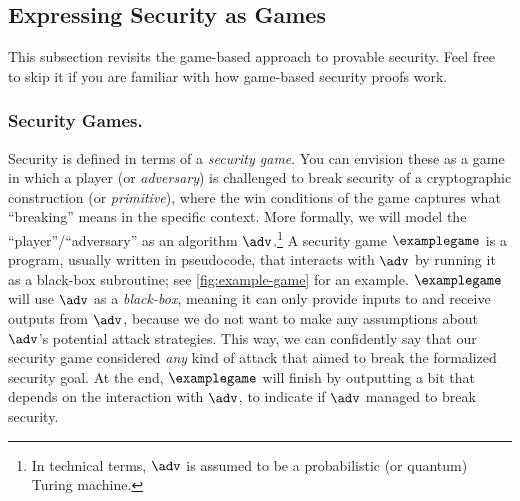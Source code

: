 


  \subsection{Expressing Security as Games}
    This subsection revisits the game-based approach to provable security.
      Feel free to skip it if you are familiar with how game-based security proofs work.

    
    \subsubsection{Security Games.}
    	Security is defined in terms of a \emph{security game}.
      	You can envision these as a game in which a player (or \emph{adversary})
      	is challenged to break security of a cryptographic construction (or \emph{primitive}),
      	where the win conditions of the game captures what ``breaking'' means in the specific context.
      	More formally, we will model the ``player''/``adversary'' as an
        algorithm $\adv$.\footnote{
          In technical terms, $\adv$ is assumed to be a probabilistic (or quantum) Turing machine.
        }
        A security game $\examplegame$ is a program, usually written in pseudocode, %
        that interacts with $\adv$ by running it as a black-box subroutine; see
        \cref{fig:example-game} for an example.
        $\examplegame$ will use  $\adv$ as a \emph{black-box}, meaning it can
        only provide inputs to and receive outputs from $\adv$,
      	because we do not want to make any assumptions about $\adv$'s potential
        attack strategies. This way, we can confidently say that our security game considered
      	\emph{any} kind of attack that aimed to break the formalized security goal.
      	At the end, $\examplegame$  will finish by outputting a bit
      	that depends on the interaction with $\adv$, to indicate if $\adv$ managed to break security.

